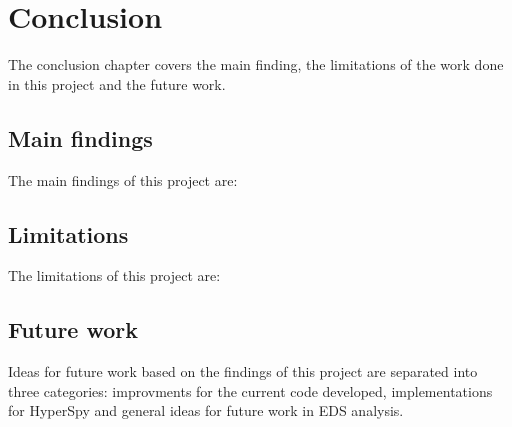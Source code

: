 
\chapter{Conclusion}
\label{chap:conclusion}


The conclusion chapter covers the main finding, the limitations of the work done in this project and the future work.

\section{Main findings}
\label{sec:mainfindings}

The main findings of this project are:





\section{Limitations}
\label{sec:limitations}

The limitations of this project are:




\section{Future work}
\label{sec:futurework}

Ideas for future work based on the findings of this project are separated into three categories: improvments for the current code developed, implementations for HyperSpy and general ideas for future work in EDS analysis.











